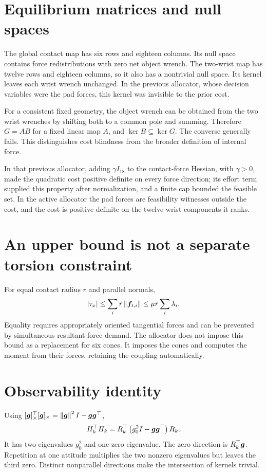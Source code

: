 \section{Equilibrium matrices and null spaces}

The global contact map has six rows and eighteen columns. Its null space contains force redistributions with zero net object wrench. The two-wrist map has twelve rows and eighteen columns, so it also has a nontrivial null space. Its kernel leaves each wrist wrench unchanged. In the previous allocator, whose decision variables were the pad forces, this kernel was invisible to the prior cost.

For a consistent fixed geometry, the object wrench can be obtained from the two wrist wrenches by shifting both to a common pole and summing. Therefore $G=AB$ for a fixed linear map $A$, and $\ker B\subseteq\ker G$. The converse generally fails. This distinguishes cost blindness from the broader definition of internal force.

In that previous allocator, adding $\gamma I_{18}$ to the contact-force Hessian, with $\gamma>0$, made the quadratic cost positive definite on every force direction; its effort term supplied this property after normalization, and a finite cap bounded the feasible set. In the active allocator the pad forces are feasibility witnesses outside the cost, and the cost is positive definite on the twelve wrist components it ranks.

\section{An upper bound is not a separate torsion constraint}

For equal contact radius $r$ and parallel normals,
\begin{equation}
|\tau_x|\leq\sum_i r\left\lVert\bm{f}_{t,i}\right\rVert\leq\mu r\sum_i\lambda_i.
\end{equation}
Equality requires appropriately oriented tangential forces and can be prevented by simultaneous resultant-force demand. The allocator does not impose this bound as a replacement for six cones. It imposes the cones and computes the moment from their forces, retaining the coupling automatically.

\section{Observability identity}

Using $[\bm{g}]_{\times}^\top[\bm{g}]_{\times}=\left\lVert\bm{g}\right\rVert^2I-\bm{g}\bm{g}^\top$,
\begin{equation}
H_k^\top H_k=R_k^\top\left(g_0^2I-\bm{g}\bm{g}^\top\right)R_k.
\end{equation}
It has two eigenvalues $g_0^2$ and one zero eigenvalue. The zero direction is $R_k^\top\bm{g}$. Repetition at one attitude multiplies the two nonzero eigenvalues but leaves the third zero. Distinct nonparallel directions make the intersection of kernels trivial.

